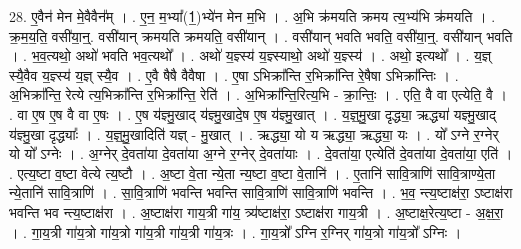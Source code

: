 \documentclass[17pt]{extarticle}
\begin{document}
28. ए॒वैन॑ मेन मे॒वैवैन᳚म् । . ए॒न॒ म॒भ्या᳚(1॒)भ्ये॑न मेन म॒भि । . अ॒भि क्र॑मयति क्रमय त्य॒भ्य॑भि क्र॑मयति । . क्र॒म॒य॒ति॒ वसी॑या॒न्॒. वसी॑यान् क्रमयति क्रमयति॒ वसी॑यान् । . वसी॑यान् भवति भवति॒ वसी॑या॒न्॒. वसी॑यान् भवति । . भ॒व॒त्यथो॒ अथो॑ भवति भव॒त्यथो᳚ । . अथो॑ य॒ज्ञ्स्य॑ य॒ज्ञ्स्याथो॒ अथो॑ य॒ज्ञ्स्य॑ । . अथो॒ इत्यथो᳚ । . य॒ज्ञ् स्यै॒वैव य॒ज्ञ्स्य॑ य॒ज्ञ् स्यै॒व । . ए॒वै षैषै वैवैषा । . ए॒षा ऽभिक्रा᳚न्ति र॒भिक्रा᳚न्ति रे॒षैषा ऽभिक्रा᳚न्तिः । . अ॒भिक्रा᳚न्ति॒ रेत्ये त्य॒भिक्रा᳚न्ति र॒भिक्रा᳚न्ति॒ रेति॑ । . अ॒भिक्रा᳚न्ति॒रित्य॒भि - क्रा॒न्तिः॒ । . एति॒ वै वा एत्येति॒ वै । . वा ए॒ष ए॒ष वै वा ए॒षः । . ए॒ष य॑ज्ञ्मु॒खाद् य॑ज्ञ्मु॒खादे॒ष ए॒ष य॑ज्ञ्मु॒खात् । . य॒ज्ञ्॒मु॒खा दृद्ध्या॒ ऋद्ध्या॑ यज्ञ्मु॒खाद् य॑ज्ञ्मु॒खा दृद्ध्याः᳚ । . य॒ज्ञ्॒मु॒खादिति॑ यज्ञ् - मु॒खात् । . ऋद्ध्या॒ यो य ऋद्ध्या॒ ऋद्ध्या॒ यः । . यो᳚ ऽग्ने र॒ग्नेर् यो यो᳚ ऽग्नेः । . अ॒ग्नेर् दे॒वता॑या दे॒वता॑या अ॒ग्ने र॒ग्नेर् दे॒वता॑याः । . दे॒वता॑या॒ एत्येति॑ दे॒वता॑या दे॒वता॑या॒ एति॑ । . एत्य॒ष्टा व॒ष्टा वेत्ये त्य॒ष्टौ । . अ॒ष्टा वे॒ता न्ये॒ता न्य॒ष्टा व॒ष्टा वे॒तानि॑ । . ए॒तानि॑ सावि॒त्राणि॑ सावि॒त्राण्ये॒ता न्ये॒तानि॑ सावि॒त्राणि॑ । . सा॒वि॒त्राणि॑ भवन्ति भवन्ति सावि॒त्राणि॑ सावि॒त्राणि॑ भवन्ति । . भ॒व॒ न्त्य॒ष्टाक्ष॑रा॒ ऽष्टाक्ष॑रा भवन्ति भव न्त्य॒ष्टाक्ष॑रा । . अ॒ष्टाक्ष॑रा गाय॒त्री गा॑य॒ त्र्य॑ष्टाक्ष॑रा॒ ऽष्टाक्ष॑रा गाय॒त्री । . अ॒ष्टाक्ष॒रेत्य॒ष्टा - अ॒क्ष॒रा॒ । . गा॒य॒त्री गा॑य॒त्रो गा॑य॒त्रो गा॑य॒त्री गा॑य॒त्री गा॑य॒त्रः । . गा॒य॒त्रो᳚ ऽग्नि र॒ग्निर् गा॑य॒त्रो गा॑य॒त्रो᳚ ऽग्निः । \newline
\end{document}
